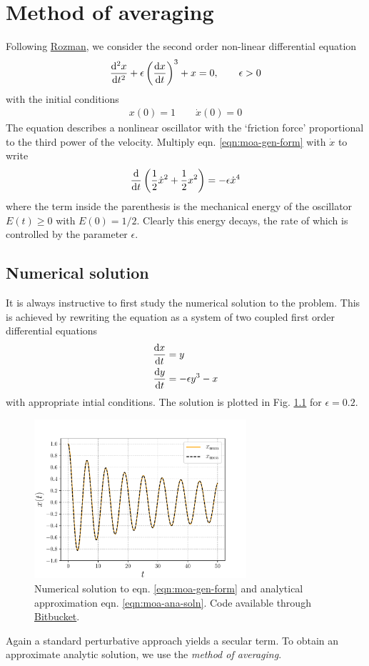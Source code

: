 \chapter{Method of averaging}
Following \href{https://www.phys.uconn.edu/~rozman/Courses/P2400_17S/downloads/averaging.pdf}{Rozman}, we consider the second order non-linear differential equation
\begin{gather}\label{eqn:moa-gen-form}
	\frac{\mathrm{d}^2 x}{\mathrm{d} t^2} + \epsilon \left(\frac{\mathrm{d} x}{\mathrm{d} t}\right)^3 + x = 0, \qquad \epsilon > 0
\end{gather}
with the initial conditions
\begin{gather}
	x(0) = 1	\qquad \dot{x}(0) = 0
\end{gather}
The equation describes a nonlinear oscillator with the `friction force' proportional to the third power of the velocity. Multiply eqn. \ref{eqn:moa-gen-form} with $\dot{x}$ to write
\begin{gather*}
	\frac{\mathrm{d}}{\mathrm{d} t} \left(\frac{1}{2} \dot{x}^2 + \frac{1}{2}x^2\right) = -\epsilon \dot{x}^4
\end{gather*}
where the term inside the parenthesis is the mechanical energy of the oscillator $E(t) \ge 0$ with $E(0)=1/2$. Clearly this energy decays, the rate of which is controlled by the parameter $\epsilon$.
\section*{Numerical solution}
It is always instructive to first study the numerical solution to the problem. This is achieved by rewriting the equation as a system of two coupled first order differential equations
\begin{align*}
	\frac{\mathrm{d} x}{\mathrm{d} t} &= y \\
	\frac{\mathrm{d} y}{\mathrm{d} t} &= -\epsilon y^3 - x
\end{align*}
with appropriate intial conditions. The solution is plotted in Fig. \ref{fig:nonlin-oscillator} for $\epsilon = 0.2$.
\begin{figure}[!h]
	\centering
	\includegraphics[width=0.7\textwidth]{./plots/pdf/nonlin-oscillator.pdf}
	\caption{ Numerical solution to eqn. \ref{eqn:moa-gen-form} and analytical approximation eqn. \ref{eqn:moa-ana-soln}. Code available through \href{https://bitbucket.org/arkabokshi/mynotes/src/master/MathematicalDoodles/nonlin-oscillator.py}{Bitbucket}.}
	\label{fig:nonlin-oscillator}
\end{figure}
Again a standard perturbative approach yields a secular term. To obtain an approximate analytic solution, we use the \emph{method of averaging}.
